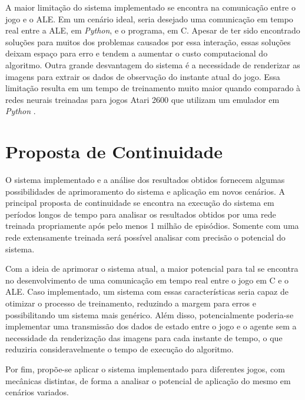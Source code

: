 A maior limitação do sistema implementado se encontra na comunicação entre o jogo e o ALE. Em um cenário ideal, seria desejado uma comunicação em tempo real entre a ALE, em \textit{Python}, e o programa, em C. Apesar de ter sido encontrado soluções para muitos dos problemas causados por essa interação, essas soluções deixam espaço para erro e tendem a aumentar o custo computacional do algoritmo. Outra grande desvantagem do sistema é a necessidade de renderizar as imagens para extrair os dados de observação do instante atual do jogo. Essa limitação resulta em um tempo de treinamento muito maior quando comparado à redes neurais treinadas para jogos Atari 2600 que utilizam um emulador em \textit{Python} \cite{brockman2016openai}.

\section{Proposta de Continuidade} %
\label{sec:proposta_de_continuidade}

O sistema implementado e a análise dos resultados obtidos fornecem algumas possibilidades de aprimoramento do sistema e aplicação em novos cenários. A principal proposta de continuidade se encontra na execução do sistema em períodos longos de tempo para analisar os resultados obtidos por uma rede treinada propriamente após pelo menos 1 milhão de episódios. Somente com uma rede extensamente treinada será possível analisar com precisão o potencial do sistema.

Com a ideia de aprimorar o sistema atual, a maior potencial para tal se encontra no desenvolvimento de uma comunicação em tempo real entre o jogo em C e o ALE. Caso implementado, um sistema com essas características seria capaz de otimizar o processo de treinamento, reduzindo a margem para erros e possibilitando um sistema mais genérico. Além disso, potencialmente poderia-se implementar uma transmissão dos dados de estado entre o jogo e o agente sem a necessidade da renderização das imagens para cada instante de tempo, o que reduziria consideravelmente o tempo de execução do algoritmo.

Por fim, propõe-se aplicar o sistema implementado para diferentes jogos, com mecânicas distintas, de forma a analisar o potencial de aplicação do mesmo em cenários variados.


